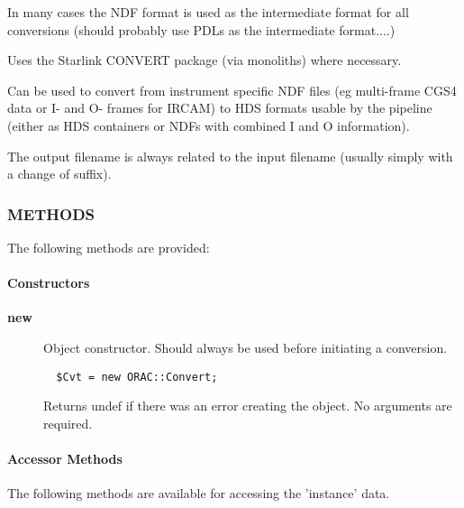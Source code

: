 In many cases the NDF format is used as the intermediate format for
all conversions (should probably use PDLs as the intermediate
format....)



Uses the Starlink CONVERT package (via monoliths) where necessary.



Can be used to convert from instrument specific NDF files (eg
multi-frame CGS4 data or I- and O- frames for IRCAM) to HDS formats
usable by the pipeline (either as HDS containers or NDFs with combined
I and O information).



The output filename is always related to the input filename
(usually simply with a change of suffix).

\subsubsection*{METHODS\label{ORAC::Convert_METHODS}}


The following methods are provided:

\paragraph*{Constructors\label{ORAC::Convert_Constructors}}
\begin{description}

\item[{\textbf{new}}] \mbox{}

Object constructor. Should always be used before initiating a conversion.

\begin{verbatim}
  $Cvt = new ORAC::Convert;
\end{verbatim}


Returns undef if there was an error creating the object. No arguments
are required.

\end{description}
\paragraph*{Accessor Methods\label{ORAC::Convert_Accessor_Methods}}


The following methods are available for accessing the
'instance' data.

